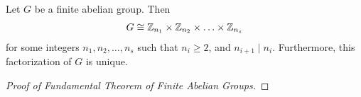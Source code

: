 \documentclass{memoir}
\begin{document}


\begin{thm}
	Let \(G\) be a finite abelian group. Then
	\begin{align*}
		G \cong \mathbb{Z}_{n_1} \times \mathbb{Z}_{n_2}\times \ldots\times \mathbb{Z}_{n_s}
	\end{align*}
	for some integers \(n_1,n_2,\ldots,n_s\) such that \(n_i \geq 2\), and \(n_{i+1}\mid n_i\). Furthermore, this factorization of \(G\) is unique.
\end{thm}
\begin{proof}[Proof of Fundamental Theorem of Finite Abelian Groups]
	
\end{proof}

\end{document}
